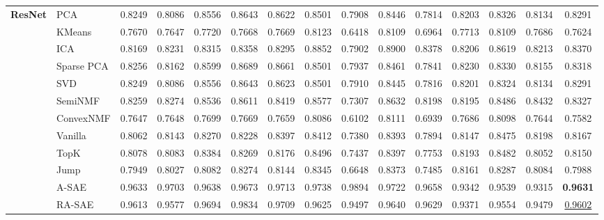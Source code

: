 \begin{table*}[h!]
{{\begin{tabular}{ll|cccccccccccc|c}
\multirow{8}{*}{\textbf{ResNet}} 
& PCA         & 0.8249 & 0.8086 & 0.8556 & 0.8643 & 0.8622 & 0.8501 & 0.7908 & 0.8446 & 0.7814 & 0.8203 & 0.8326 & 0.8134 & 0.8291 \\
& KMeans      & 0.7670 & 0.7647 & 0.7720 & 0.7668 & 0.7669 & 0.8123 & 0.6418 & 0.8109 & 0.6964 & 0.7713 & 0.8109 & 0.7686 & 0.7624 \\
& ICA         & 0.8169 & 0.8231 & 0.8315 & 0.8358 & 0.8295 & 0.8852 & 0.7902 & 0.8900 & 0.8378 & 0.8206 & 0.8619 & 0.8213 & 0.8370 \\
& Sparse PCA  & 0.8256 & 0.8162 & 0.8599 & 0.8689 & 0.8661 & 0.8501 & 0.7937 & 0.8461 & 0.7841 & 0.8230 & 0.8330 & 0.8155 & 0.8318 \\
& SVD         & 0.8249 & 0.8086 & 0.8556 & 0.8643 & 0.8623 & 0.8501 & 0.7910 & 0.8445 & 0.7816 & 0.8201 & 0.8324 & 0.8134 & 0.8291 \\
& SemiNMF     & 0.8259 & 0.8274 & 0.8536 & 0.8611 & 0.8419 & 0.8577 & 0.7307 & 0.8632 & 0.8198 & 0.8195 & 0.8486 & 0.8432 & 0.8327 \\
& ConvexNMF   & 0.7647 & 0.7648 & 0.7699 & 0.7669 & 0.7659 & 0.8086 & 0.6102 & 0.8111 & 0.6939 & 0.7686 & 0.8098 & 0.7644 & 0.7582 \\
& Vanilla     & 0.8062 & 0.8143 & 0.8270 & 0.8228 & 0.8397 & 0.8412 & 0.7380 & 0.8393 & 0.7894 & 0.8147 & 0.8475 & 0.8198 & 0.8167 \\
& TopK        & 0.8078 & 0.8083 & 0.8384 & 0.8269 & 0.8176 & 0.8496 & 0.7437 & 0.8397 & 0.7753 & 0.8193 & 0.8482 & 0.8052 & 0.8150 \\
& Jump        & 0.7949 & 0.8027 & 0.8082 & 0.8274 & 0.8144 & 0.8345 & 0.6648 & 0.8373 & 0.7485 & 0.8161 & 0.8287 & 0.8084 & 0.7988 \\
& A-SAE       & 0.9633 & 0.9703 & 0.9638 & 0.9673 & 0.9713 & 0.9738 & 0.9894 & 0.9722 & 0.9658 & 0.9342 & 0.9539 & 0.9315 & \textbf{0.9631} \\
& RA-SAE       & 0.9613 & 0.9577 & 0.9694 & 0.9834 & 0.9709 & 0.9625 & 0.9497 & 0.9640 & 0.9629 & 0.9371 & 0.9554 & 0.9479 & \underline{0.9602} \\
\midrule


\end{tabular}}}
\end{table*}
